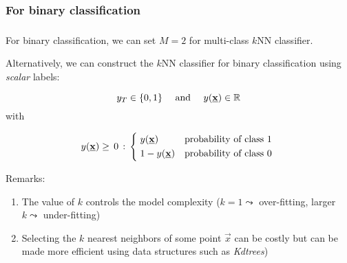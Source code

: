 \subsubsection{For binary classification}

\begin{frame}\frametitle{\subsubsecname}

For binary classification, we can set $M=2$ for multi-class $k$NN classifier.

Alternatively, we can construct the $k$NN classifier for binary classification using \emph{scalar} labels:

\begin{equation}
y_T \in \{0,1\}\quad \text{ and }\quad y(\underline{\mathbf{x}}) \in \mathbb{R}
\end{equation}
with

\begin{equation}
y(\vec x) \ge\,0\,:\,
\begin{cases*}
      \;y(\vec x) & probability of class $1$ \\
      \;1-y(\vec x)     & probability of class $0$
    \end{cases*}
\end{equation}


\pause


Remarks:
\begin{enumerate}
\item The value of $k$ controls the model complexity ($k = 1 \leadsto$ over-fitting, larger $k \leadsto$ under-fitting)
\item Selecting the $k$ nearest neighbors of some point $\vec x$ can be costly but can be made more efficient using data structures such as \emph{Kdtrees})
\end{enumerate}

\end{frame}
